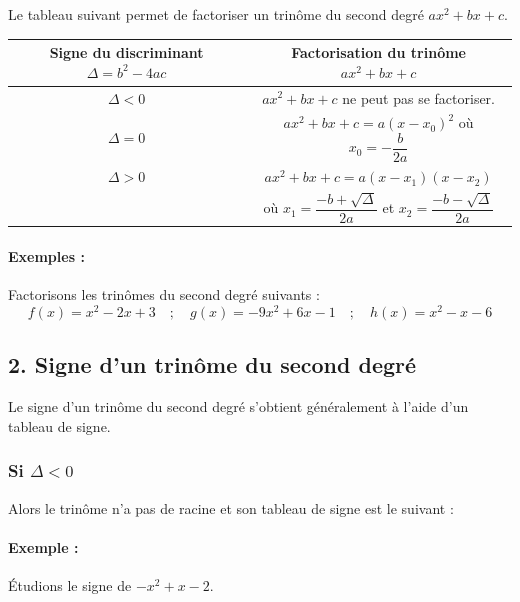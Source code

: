 \documentclass[12pt,a4paper]{article}
\begin{document}
Le tableau suivant permet de factoriser un trinôme du second degré \(ax^2 + bx + c\).

\begin{table}[h]
\centering
\begin{tabular}{|c|c|}
\hline
\textbf{Signe du discriminant} \(\Delta = b^2 - 4ac\) & \textbf{Factorisation du trinôme} \(ax^2 + bx + c\) \\
\hline
\(\Delta < 0\) & \(ax^2 + bx + c\) ne peut pas se factoriser. \\
\hline
\(\Delta = 0\) & \(ax^2 + bx + c = a(x - x_0)^2\) où \(x_0 = -\dfrac{b}{2a}\) \\
\hline
\(\Delta > 0\) & \(ax^2 + bx + c = a(x - x_1)(x - x_2)\) \\
 & où \(x_1 = \dfrac{-b + \sqrt{\Delta}}{2a}\) et \(x_2 = \dfrac{-b - \sqrt{\Delta}}{2a}\) \\
\hline
\end{tabular}
\end{table}

\paragraph{Exemples :} Factorisons les trinômes du second degré suivants :
\[
f(x) = x^2 - 2x + 3 \quad;\quad g(x) = -9x^2 + 6x - 1 \quad;\quad h(x) = x^2 - x - 6
\]

\subsection*{2. Signe d'un trinôme du second degré}

Le signe d'un trinôme du second degré s'obtient généralement à l'aide d'un tableau de signe.

\subsubsection*{Si \(\Delta < 0\)}
Alors le trinôme n'a pas de racine et son tableau de signe est le suivant :

\begin{center}
\end{center}

\paragraph{Exemple :} Étudions le signe de \(-x^2 + x - 2\).
\end{document}
